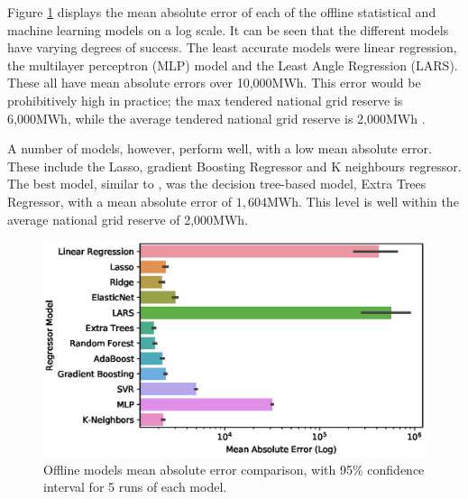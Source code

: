 \documentclass[final,3p,times,twocolumn,numbers]{elsarticle}
\begin{document}
Figure \ref{fig:beis_elecsim_historic_comparison} displays the mean absolute error of each of the offline statistical and machine learning models on a log scale. It can be seen that the different models have varying degrees of success. The least accurate models were linear regression, the multilayer perceptron (MLP) model and the Least Angle Regression (LARS). These all have mean absolute errors over 10,000MWh. This error would be prohibitively high in practice; the max tendered national grid reserve is 6,000MWh, while the average tendered national grid reserve is 2,000MWh \cite{ESO2019}.

A number of models, however, perform well, with a low mean absolute error. These include the Lasso, gradient Boosting Regressor and K neighbours regressor. The best model, similar to \cite{Kell2018a}, was the decision tree-based model, Extra Trees Regressor, with a mean absolute error of $1,604$MWh. This level is well within the average national grid reserve of 2,000MWh.

\begin{figure}
\centering
\includegraphics[width=\columnwidth,natwidth=500,natheight=500]{figures/results/offline_model_mae.eps}
\caption{Offline models mean absolute error comparison, with 95\% confidence interval for 5 runs of each model.}
\label{fig:beis_elecsim_historic_comparison}
\end{figure}


\end{document}
